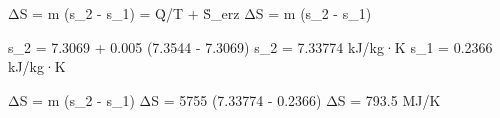 ΔS = m (s_2 - s_1) = Q̇/T + Ṡ_erz  
ΔS = m (s_2 - s_1)  

s_2 = 7.3069 + 0.005 (7.3544 - 7.3069)  
s_2 = 7.33774 kJ/kg·K  
s_1 = 0.2366 kJ/kg·K  

ΔS = m (s_2 - s_1)  
ΔS = 5755 (7.33774 - 0.2366)  
ΔS = 793.5 MJ/K